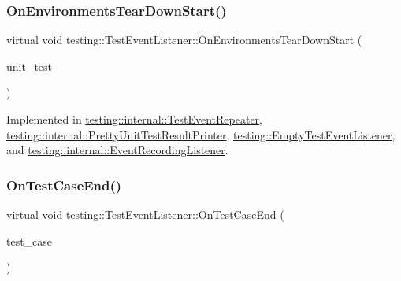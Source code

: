 \subsubsection{\texorpdfstring{On\+Environments\+Tear\+Down\+Start()}{OnEnvironmentsTearDownStart()}}
{\footnotesize\ttfamily virtual void testing\+::\+Test\+Event\+Listener\+::\+On\+Environments\+Tear\+Down\+Start (\begin{DoxyParamCaption}\item[{const \hyperlink{classtesting_1_1_unit_test}{Unit\+Test} \&}]{unit\+\_\+test }\end{DoxyParamCaption})\hspace{0.3cm}{\ttfamily [pure virtual]}}



Implemented in \hyperlink{classtesting_1_1internal_1_1_test_event_repeater_a30db75df2d9a65d787f31e16004613c2}{testing\+::internal\+::\+Test\+Event\+Repeater}, \hyperlink{classtesting_1_1internal_1_1_pretty_unit_test_result_printer_afea9dc849c92fdbc1d8505f4c74ffc1a}{testing\+::internal\+::\+Pretty\+Unit\+Test\+Result\+Printer}, \hyperlink{classtesting_1_1_empty_test_event_listener_a00fa1a4ea5831e20746188414268e7c6}{testing\+::\+Empty\+Test\+Event\+Listener}, and \hyperlink{classtesting_1_1internal_1_1_event_recording_listener_a17eebd7bb5cc6bab53b20794919ca5ae}{testing\+::internal\+::\+Event\+Recording\+Listener}.

\mbox{\label{classtesting_1_1_test_event_listener_ae61985e2ef76ac78379b077be57a9c36}} 
\subsubsection{\texorpdfstring{On\+Test\+Case\+End()}{OnTestCaseEnd()}}
{\footnotesize\ttfamily virtual void testing\+::\+Test\+Event\+Listener\+::\+On\+Test\+Case\+End (\begin{DoxyParamCaption}\item[{const \hyperlink{classtesting_1_1_test_case}{Test\+Case} \&}]{test\+\_\+case }\end{DoxyParamCaption})\hspace{0.3cm}{\ttfamily [pure virtual]}}



